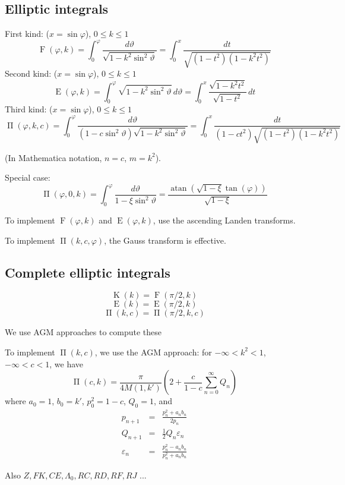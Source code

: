 \documentclass[10pt,dvipdfmx,letterpaper,twoside]{article}
\DeclareMathOperator{\atan}{atan}
\let\O=\operatorname
\newenvironment{implementation}{\noindent\begin{framed}}{\end{framed}}
\let\eps=\varepsilon
\let\theta=\vartheta
\let\phi=\varphi
\begin{document}
\subsection{Elliptic integrals}
First kind: ($x=\sin\phi$), $0\leq k\leq 1$
\[ \O{F}(\phi,k) = \int_0^\phi \frac{d\theta}{\sqrt{1-k^2\sin^2\theta}} = \int_0^x \frac{dt}{\sqrt{(1-t^2)(1-k^2t^2)}} \]
Second kind: ($x=\sin\phi$), $0\leq k\leq 1$
\[ \O{E}(\phi,k) = \int_0^\phi \sqrt{1-k^2\sin^2\theta}\,d\theta = \int_0^x\frac{\sqrt{1-k^2t^2}}{\sqrt{1-t^2}}\,dt \]
Third kind: ($x=\sin\phi$), $0\leq k\leq 1$
\[ \O{\Pi}(\phi,k,c) = \int_0^\phi\frac{d\theta}{(1-c\sin^2\theta)\sqrt{1-k^2\sin^2\theta}} = \int_0^x\frac{dt}{(1-ct^2)\sqrt{(1-t^2)(1-k^2t^2)}} \]

(In Mathematica notation, $n=c$, $m=k^2$).

Special case:
\[ \O{\Pi}(\phi,0,k) = \int_0^\phi\frac{d\theta}{1 - \xi\sin^2\theta} = \frac{\atan(\sqrt{1-\xi} \tan(\phi))}{\sqrt{1-\xi}} \]

\begin{implementation}
To implement $\O{F}(\phi,k)$ and $\O{E}(\phi,k)$, use the ascending Landen transforms.

To implement $\O{\Pi}(k,c,\phi)$, the Gauss transform is effective.
\end{implementation}


\subsection{Complete elliptic integrals}
\[ \O{K}(k) = \O{F}(\pi/2,k) \]
\[ \O{E}(k) = \O{E}(\pi/2,k) \]
\[ \O{\Pi}(k,c) = \O{\Pi}(\pi/2,k,c) \]

We use AGM approaches to compute these
\begin{implementation}
To implement $\O{\Pi}(k,c)$, we use the AGM approach: for $-\infty<k^2<1$, $-\infty<c<1$, we have
\[ \O{\Pi}(c,k) = \frac{\pi}{4 M(1,k')}\left(2 + \frac{c}{1-c}\sum_{n=0}^\infty Q_n\right) \]
where $a_0 = 1$, $b_0 = k'$, $p_0^2 = 1-c$, $Q_0 = 1$,
and
\begin{eqnarray*}
p_{n+1} &=& \frac{p_n^2 + a_n b_n}{2 p_n} \\
Q_{n+1} &=& \frac12 Q_n \eps_n \\
\eps_{n} &=& \frac{p_n^2 - a_n b_n}{p_n^2 + a_n b_n}
\end{eqnarray*}
\end{implementation}

Also $Z, FK, CE, \Lambda_0, RC, RD, RF, RJ$ ...
\end{document}
